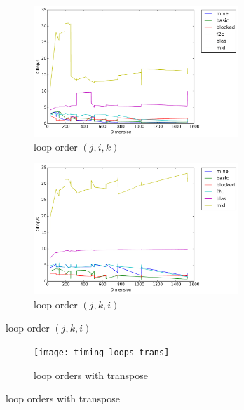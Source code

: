 \documentclass[12pt]{article}
\numberwithin{equation}{section}
\begin{document}
\begin{figure}[!ht]
   \begin{subfigure}
      \centering
        \begin{center}
      \includegraphics[width=0.85\textwidth] {jik}
        \end{center}
      \label{aload0}
      \caption{loop order $(j, i, k)$}
  \end{subfigure}
  \begin{subfigure}
      \centering
        \begin{center}
      \includegraphics[width=0.85\textwidth] {jki}
        \end{center}
      \label{aload1}
      \caption{loop order $(j, k, i)$}
  \end{subfigure}

\end{figure}

\begin{figure}[!ht]
  \begin{subfigure}
    \centering
      \begin{center}
    \texttt{[image: timing\_loops\_trans]}
      \end{center}
    \label{aload1}
    \caption{loop orders with transpose}
  \end{subfigure}
  
\end{figure}
\end{document}
